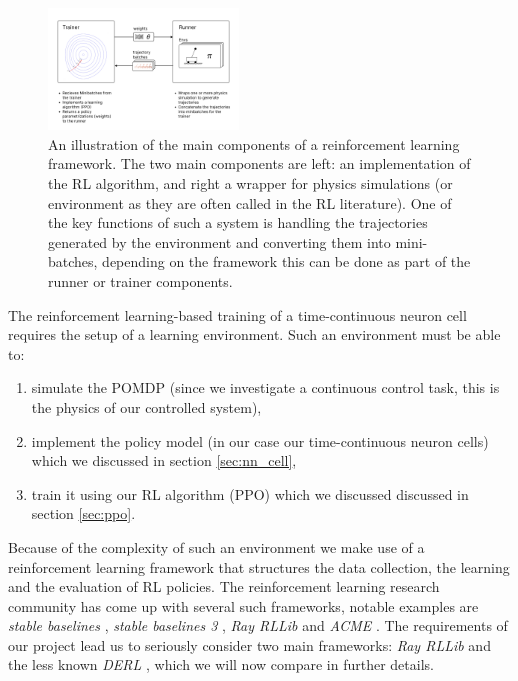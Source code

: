 \begin{figure}[h!]
    \centering
    \includegraphics[width=0.45\textwidth]{figures/Framework.pdf}
    \caption{An illustration of the main components of a reinforcement learning framework. The two main components are left: an implementation of the RL algorithm, and right a wrapper for physics simulations (or environment as they are often called in the RL literature). One of the key functions of such a system is handling the trajectories generated by the environment and converting them into mini-batches, depending on the framework this can be done as part of the runner or trainer components.}
\end{figure}

The reinforcement learning-based training of a time-continuous neuron cell requires the setup of a learning environment. Such an environment must be able to:
\begin{enumerate}
    \item simulate the POMDP (since we investigate a continuous control task, this is the physics of our controlled system),
    \item implement the policy model (in our case our time-continuous neuron cells) which we discussed in section \ref{sec:nn_cell},
    \item train it using our RL algorithm (PPO) which we discussed discussed in section \ref{sec:ppo}.
\end{enumerate}

Because of the complexity of such an environment we make use of a reinforcement learning framework that structures the data collection, the learning and the evaluation of RL policies. The reinforcement learning research community has come up with several such frameworks, notable examples are \textit{stable baselines} \cite{stable-baselines}, \textit{stable baselines 3} \cite{stable-baselines3}, \textit{Ray RLLib} \cite{rllib} and \textit{ACME} \cite{hoffman2020acme}. The requirements of our project lead us to seriously consider two main frameworks: \textit{Ray RLLib} \cite{rllib} and the less known \textit{DERL} \cite{konobeev2018},  which we will now compare in further details.

